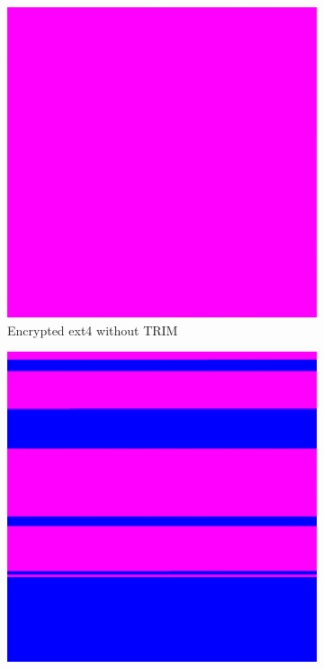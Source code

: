 \documentclass[
  digital, %
  oneside, %
  lof,     %
  lot,     %
]{fithesis4}
\begin{document}
\begin{figure}
  \centering
  \begin{subfigure}[t]{0.45\textwidth}
    \centering
    \includegraphics[width=\textwidth,interpolate=false]{figures/test-ext4-no-trim-chi2-4-sweeping.png}
    \caption{Encrypted ext4 without TRIM}
    \label{fig:trim-ext4-no-trim}
  \end{subfigure}
  \hfill
  \begin{subfigure}[t]{0.45\textwidth}
    \centering
    \includegraphics[width=\textwidth,interpolate=false]{figures/test-ext4-chi2-4-sweeping.png}

\end{subfigure}
\end{figure}
\end{document}
